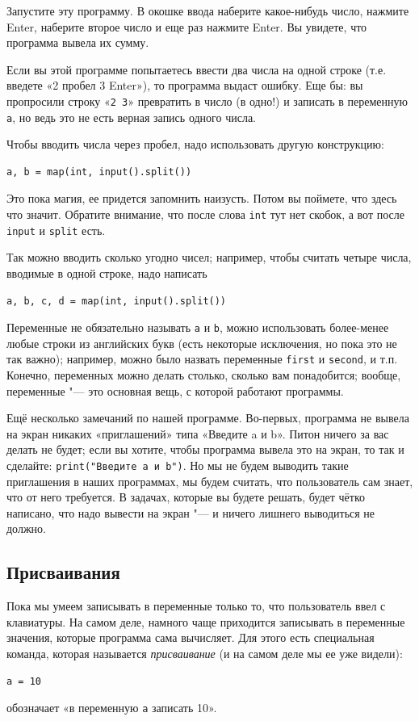 Запустите эту программу. В окошке ввода наберите какое-нибудь число, нажмите Enter, наберите второе число
и еще раз нажмите Enter. Вы увидете, что программа вывела их сумму.

Если вы этой программе попытаетесь ввести два числа на одной строке (т.е. введете «2 пробел 3 Enter»),
то программа выдаст ошибку. Еще бы: вы пропросили строку «\verb`2 3`» превратить в число (в одно!) и записать
в переменную \verb`a`, но ведь это не есть верная запись одного числа.

Чтобы вводить числа через пробел, надо использовать другую конструкцию:
\begin{verbatim}
a, b = map(int, input().split())
\end{verbatim}

Это пока магия, ее придется запомнить наизусть. Потом вы поймете, что здесь что значит. Обратите внимание, что
после слова \verb`int` тут нет скобок, а вот после \verb`input` и \verb`split` есть.

Так можно вводить сколько угодно чисел; например, чтобы считать четыре числа, вводимые в одной строке, надо написать
\begin{verbatim}
a, b, c, d = map(int, input().split())
\end{verbatim}

Переменные не обязательно называть \verb`a` и \verb`b`, можно использовать более-менее любые строки из
английских букв (есть некоторые исключения, но пока это не так важно); например, можно было назвать
переменные \verb`first` и \verb`second`, и т.п. Конечно, переменных можно делать столько, сколько вам понадобится;
вообще, переменные "--- это основная вещь, с которой работают программы.

Ещё несколько замечаний по нашей программе. Во-первых, программа не вывела на экран никаких 
«приглашений» типа «Введите a и b». Питон ничего за вас делать не 
будет; если вы хотите, чтобы программа вывела это на экран, то так и сделайте: 
\verb`print("Введите a и b")`. Но мы не будем выводить 
такие приглашения в наших программах, мы будем считать, что пользователь сам знает, что от него 
требуется. В задачах, которые вы будете решать, будет чётко написано, что надо вывести на экран 
"--- и ничего лишнего выводиться не должно. 

\subsection{Присваивания}

Пока мы умеем записывать в переменные только то, что пользователь ввел с клавиатуры.
На самом деле, намного чаще приходится записывать в переменные значения, которые
программа сама вычисляет. Для этого есть специальная команда, которая называется
\textit{присваивание} (и на самом деле мы ее уже видели):
\begin{verbatim}
a = 10
\end{verbatim}
обозначает «в переменную \verb`a` записать 10». 

